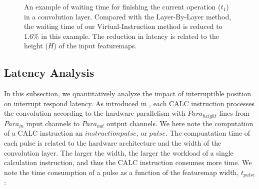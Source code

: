 \begin{figure}[t]
	\centering
	\vspace{-1mm} 
	\caption{ An example of waiting time for finishing the current operation ($t_1$) in a convolution layer. Compared with the Layer-By-Layer method, the waiting time of our Virtual-Instruction method is reduced to $1.6\%$ in this example. The reduction in latency is related to the height ($H$) of the input featuremaps.  }
	\label{fig:t1example}
\end{figure}



\subsection {Latency Analysis}

In this subsection, we quantitatively analyze the impact of interruptible position on interrupt respond latency. 
As introduced in , each CALC  instruction processes the convolution according to the hardware parallelism with $Para_{height}$ lines from $ Para_{in} $ input channels to $ Para_{out}$ output channels. 
We here note the computation of a CALC instruction an $instruction pulse$, or $pulse$.
The compuatation time of each pulse is related to the hardware architecture and the width of the convolution layer. The larger the width, the larger the workload of a single calculation instruction, and thus the CALC instruction consumes more time. We note the time consumption of a pulse as a function of the featuremap width, $t_{pulse}$:

